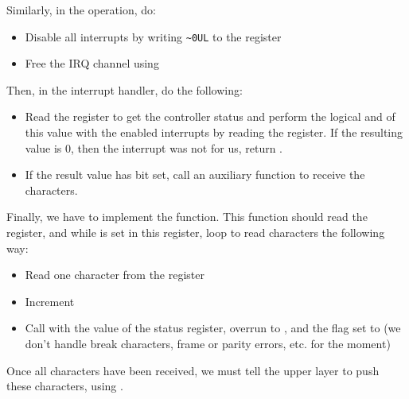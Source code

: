 Similarly, in the  operation, do:

\begin{itemize}

\item Disable all interrupts by writing \verb+~0UL+ to the
   register

\item Free the IRQ channel using 

\end{itemize}

Then, in the interrupt handler, do the following:

\begin{itemize}

\item Read the  register to get the controller
  status and perform the logical and of this value with the enabled
  interrupts by reading the  register. If the
  resulting value is 0, then the interrupt was not for us, return
  .

\item If the result value has bit  set, call an
  auxiliary function  to receive the characters.

\end{itemize}

Finally, we have to implement the 
function. This function should read the 
register, and while  is set in this register,
loop to read characters the following way:

\begin{itemize}

\item Read one character from the  register

\item Increment 

\item Call  with the value of the status
  register, overrun to , and the flag set to
   (we don't handle break characters, frame or
  parity errors, etc. for the moment)

\end{itemize}

Once all characters have been received, we must tell the upper layer
to push these characters, using .

